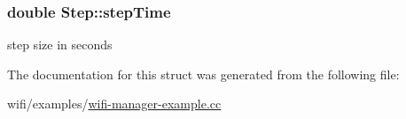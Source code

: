\subsubsection[{\texorpdfstring{step\+Time}{stepTime}}]{\setlength{\rightskip}{0pt plus 5cm}double Step\+::step\+Time}\hypertarget{structStep_a9d7cdfbd213343951d23c3c4c61604bd}{}\label{structStep_a9d7cdfbd213343951d23c3c4c61604bd}


step size in seconds 



The documentation for this struct was generated from the following file\+:\begin{DoxyCompactItemize}
\item 
wifi/examples/\hyperlink{wifi-manager-example_8cc}{wifi-\/manager-\/example.\+cc}\end{DoxyCompactItemize}
